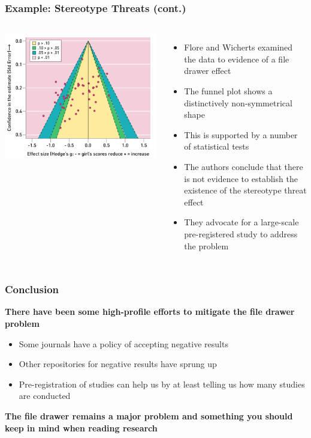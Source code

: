 \documentclass[10pt, block=fill]{beamer}
\begin{document}
\begin{frame}
    \frametitle{Example: Stereotype Threats (cont.)}
    
    \begin{columns}
        \includegraphics[width=1.0\linewidth]{figures/stereotype_threats_funnel_plot.png}
    
        \begin{itemize}
          \item Flore and Wicherts examined the data to evidence of a file drawer effect
          \item The funnel plot shows a distinctively non-symmetrical shape
          \item This is supported by a number of statistical tests
          \item The authors conclude that there is not evidence to establish the existence of the stereotype threat effect
          \item They advocate for a large-scale pre-registered study to address the problem
        \end{itemize}
    \end{columns}
    
\end{frame}


\begin{frame}
    \frametitle{Conclusion}
    
    \textbf{There have been some high-profile efforts to mitigate the file drawer problem}
    \begin{itemize}
        \item Some journals have a policy of accepting negative results
        \item Other repositories for negative results have sprung up
        \item Pre-registration of studies can help us by at least telling us how many studies are conducted
    \end{itemize}
    
    \textbf{The file drawer remains a major problem and something you should keep in mind when reading research}
\end{frame}
\end{document}
